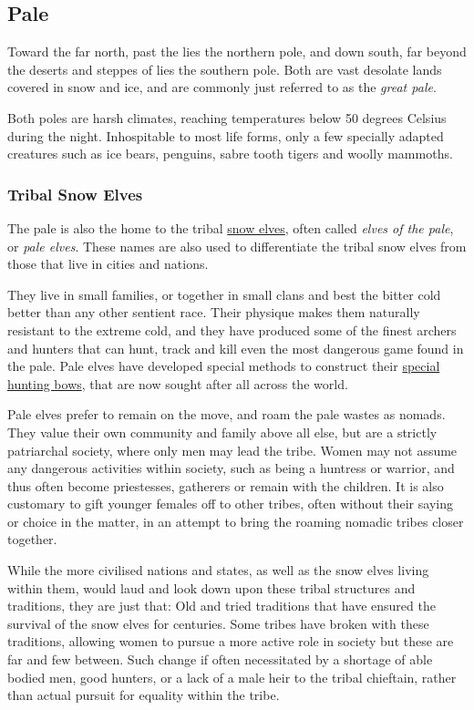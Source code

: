 \subsection{Pale}
\label{sec:Pale}

Toward the far north, past the  lies the northern
pole, and down south, far beyond the deserts and steppes of 
lies the southern pole. Both are vast desolate lands covered in snow and ice,
and are commonly just referred to as the \emph{great pale}.

Both poles are harsh climates, reaching temperatures below 50 degrees Celsius
during the night. Inhospitable to most life forms, only a few specially adapted
creatures such as ice bears, penguins, sabre tooth tigers and woolly mammoths.

\subsubsection{Tribal Snow Elves}
\label{sec:Tribal Snow Elves}

The pale is also the home to the tribal \hyperref[sec:Snow Elves]{snow elves},
often called \emph{elves of the pale}, or \emph{pale elves}. These names are
also used to differentiate the tribal snow elves from those that live in
cities and nations.

They live in small families, or together in small clans and best the bitter
cold better than any other sentient race. Their physique makes them naturally
resistant to the extreme cold, and they have produced some of the finest
archers and hunters that can hunt, track and kill even the most dangerous game
found in the pale. Pale elves have developed special methods to construct
their \hyperref[sec:Snow Elf Bow]{special hunting bows}, that are now sought
after all across the world.

Pale elves prefer to remain on the move, and roam the pale wastes as nomads.
They value their own community and family above all else, but are a strictly
patriarchal society, where only men may lead the tribe. Women may not assume
any dangerous activities within society, such as being a huntress or warrior,
and thus often become priestesses, gatherers or remain with the children. It
is also customary to gift younger females off to other tribes, often without
their saying or choice in the matter, in an attempt to bring the roaming
nomadic tribes closer together.

While the more civilised nations and states, as well as the snow elves living
within them, would laud and look down upon these tribal structures and
traditions, they are just that: Old and tried traditions that have ensured the
survival of the snow elves for centuries. Some tribes have broken with these
traditions, allowing women to pursue a more active role in society but these
are far and few between. Such change if often necessitated by a shortage of
able bodied men, good hunters, or a lack of a male heir to the tribal
chieftain, rather than actual pursuit for equality within the tribe.


